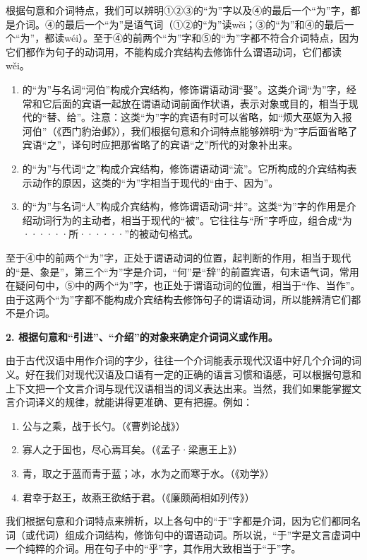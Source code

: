 根据句意和介词特点，我们可以辨明①②③的“为”字以及④的最后一个“为”字，都是介词。④的最后一个“为”是语气词（①②的“为”读wěi；③的“为”和④的最后一个“为”，都读wéi）。至于④的前两个“为”字和⑤的“为”字都不符合介词特点，因为它们都作为句子的动词用，不能构成介宾结构去修饰什么谓语动词，它们都读wěi。
\begin{enumerate}[label=\textcircled{\arabic*}]
	\item 的“为”与名词“河伯”构成介宾结构，修饰谓语动词“娶”。这类介词“为”字，经常和它后面的宾语一起放在谓语动词前面作状语，表示对象或目的，相当于现代的“替、给”。注意：这类“为”字的宾语有时可以省略，如“烦大巫妪为入报河伯”（《西门豹治邺》），我们根据句意和介词特点能够辨明“为”字后面省略了宾语“之”，译句时应把那省略了的宾语“之”所代的对象补出来。
	\item 的“为”与代词“之”构成介宾结构，修饰谓语动词“流”。它所构成的介宾结构表示动作的原因，这类的“为”字相当于现代的“由于、因为”。
	\item 的“为”与名词“人”构成介宾结构，修饰谓语动词“并”。这类“为”字的作用是介绍动词行为的主动者，相当于现代的“被”。它往往与“所”字呼应，组合成“为······所······”的被动句格式。
\end{enumerate}

至于④中的前两个“为”字，正处于谓语动词的位置，起判断的作用，相当于现代的“是、象是”，第三个“为”字是介词，“何”是“辞”的前置宾语，句末语气词，常用在疑问句中，⑤中的两个“为”字，也正处于谓语动词的位置，相当于“作、当作”。由于这两个“为”字都不能构成介宾结构去修饰句子的谓语动词，所以能辨清它们都不是介词。

\textbf{2. 根据句意和“引进”、“介绍”的对象来确定介词词义或作用。}

由于古代汉语中用作介词的字少，往往一个介词能表示现代汉语中好几个介词的词义。好在我们对现代汉语及口语有一定的正确的语言习惯和语感，可以根据句意和上下文把一个文言介词与现代汉语相当的词义表达出来。当然，我们如果能掌握文言介词译义的规律，就能讲得更准确、更有把握。例如：

\noindent
[\ 于\ ]
\begin{enumerate}[label=\textcircled{\arabic*}]
	\item 公与之乘，战于长勺。（《曹刿论战》）
	\item 寡人之于国也，尽心焉耳矣。（《孟子·梁惠王上》）
	\item 青，取之于蓝而青于蓝；冰，水为之而寒于水。（《劝学》）
	\item 君幸于赵王，故燕王欲结于君。（《廉颇蔺相如列传》）
\end{enumerate}

我们根据句意和介词特点来辨析，以上各句中的“于”字都是介词，因为它们都同名词（或代词）组成介词结构，修饰句中的谓语动词。所以说，“于”字是文言虚词中一个纯粹的介词。用在句子中的“乎”字，其作用大致相当于“于”字。

